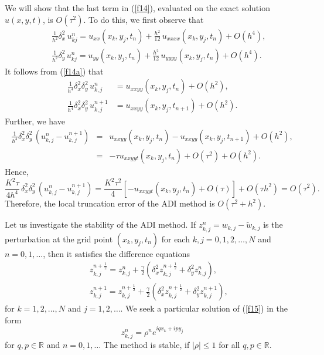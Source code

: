 We will show that the last term in
(\ref{f14}), evaluated on the exact solution $u(x,y,t)$, is $O(\tau^2)$. To do this, we first observe that
\begin{eqnarray}
&&\frac{1}{h^2}\delta_{x}^2 \, u_{kj}^n=u_{xx}(x_k,y_j,t_n)
+\frac{h^2}{12} \, u_{xxxx}(x_k,y_j,t_n)+O(h^4), \nonumber \\
&&\frac{1}{h^2}\delta_{y}^2 \, u_{kj}^n=u_{yy}(x_k,y_j,t_n)
+\frac{h^2}{12} \, u_{yyyy}(x_k,y_j,t_n)+O(h^4). \label{f14a}
\end{eqnarray}
It follows from (\ref{f14a}) that
\[\begin{split}
\frac{1}{h^4}\delta^2_{x}\delta^2_{y}\, u^{n}_{k,j}&=u_{xxyy}(x_k,y_j,t_n)
+O(h^2), \\
\frac{1}{h^4}\delta^2_{x}\delta^2_{y}\, u^{n+1}_{k,j}&=u_{xxyy}(x_k,y_j,t_{n+1})
+O(h^2).
\end{split}\]
Further, we have
\begin{eqnarray}
\frac{1}{h^4}\delta^2_{x}\delta^2_{y}\, \left( u^{n}_{k,j}-u^{n+1}_{k,j}\right) &=& u_{xxyy}(x_k,y_j,t_n)-u_{xxyy}(x_k,y_j,t_{n+1})
+O(h^2), \nonumber \\
&=&-\tau u_{xxyyt}(x_k,y_j,t_n) +O(\tau^2)+O(h^2). \label{ff14c}
\end{eqnarray}
Hence,
\[
\frac{K^2\tau}{4h^4} \, \delta^2_{x}\delta^2_{y}\, \left(u^{n}_{k,j}-u^{n+1}_{k,j}\right)=
\frac{K^2\tau^2}{4}\left[-u_{xxyyt}(x_k,y_j,t_n)+O(\tau)\right]+O(\tau h^2)=O(\tau^2).
\]
Therefore, the local truncation error
of the ADI method is $O(\tau^2+h^2)$.

\vskip 0.5cm
 
Let us investigate the stability of the ADI method. If
$z^{n}_{k,j}=w_{k,j}-\tilde{w}_{k,j}$ is
the perturbation at the grid point $(x_{k}, y_{j}, t_{n})$ for each $k,j=0,1,2, \dots, N$
and $n=0,1, \dots$, then it satisfies the difference equations
\begin{eqnarray}
&&z^{n+\frac{1}{2}}_{k,j}=z^{n}_{k,j}+\frac{\gamma}{2}
\left(\delta^2_{x}z^{n+\frac{1}{2}}_{k,j}
+\delta^2_{y}z^{n}_{k,j}\right), \nonumber \\
&&z^{n+1}_{k,j}=z^{n+\frac{1}{2}}_{k,j}+\frac{\gamma}{2}
\left(\delta^2_{x}z^{n+\frac{1}{2}}_{k,j}
+\delta^2_{y}z^{n+1}_{k,j}\right), \label{f15}
\end{eqnarray}
for $k=1,2, \dots, N$ and $j=1, 2, \dots$. We seek a particular solution of
(\ref{f15}) in the form
\[
z^{n}_{k,j}=\rho^{n}e^{iqx_{k}+ipy_{j}}
\]
for $q,p\in{\mathbb R}$ and $n=0,1,\dots$
The method is stable, if $\vert\rho\vert\leq 1$ for all $q,p\in{\mathbb R}$.

